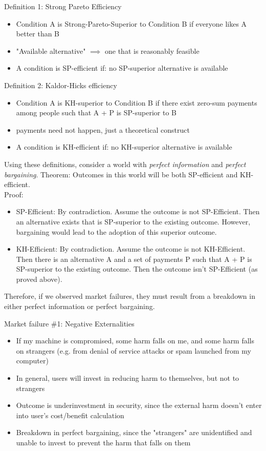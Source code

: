 Definition 1: Strong Pareto Efficiency
\begin{itemize}
    \item Condition A is Strong-Pareto-Superior to Condition B if everyone likes A better than B
    \item "Available alternative" $\implies$ one that is reasonably feasible
    \item A condition is SP-efficient if: no SP-superior alternative is available
\end{itemize}
Definition 2: Kaldor-Hicks efficiency
\begin{itemize}
    \item Condition A is KH-superior to Condition B if there exist zero-sum payments among people such that A + P is SP-superior to B
    \item payments need not happen, just a theoretical construct
    \item A condition is KH-efficient if: no KH-superior alternative is available
\end{itemize}
Using these definitions, consider a world with \emph{perfect information} and \emph{perfect bargaining}. Theorem: Outcomes in this world will be both SP-efficient and KH-efficient. 
\\
Proof:
\begin{itemize}
	\item SP-Efficient: By contradiction. Assume the outcome is not SP-Efficient. Then an alternative exists that is SP-superior to the existing outcome. However, bargaining would lead to the adoption of this superior outcome.
	\item KH-Efficient: By contradiction. Assume the outcome is not KH-Efficient. Then there is an alternative A and a set of payments P such that A + P is SP-superior to the existing outcome. Then the outcome isn't SP-Efficient (as proved above).
\end{itemize}
Therefore, if we observed market failures, they must result from a breakdown in either perfect information or perfect bargaining.

Market failure \#1: Negative Externalities
	\begin{itemize}
		\item If my machine is compromised, some harm falls on me, and some harm falls on strangers (e.g. from denial of service attacks or spam launched from my computer)
		\item In general, users will invest in reducing harm to themselves, but not to strangers
		\item Outcome is underinvestment in security, since the external harm doesn't enter into user's cost/benefit calculation
		\item Breakdown in perfect bargaining, since the "strangers" are unidentified and unable to invest to prevent the harm that falls on them
	\end{itemize}
	
